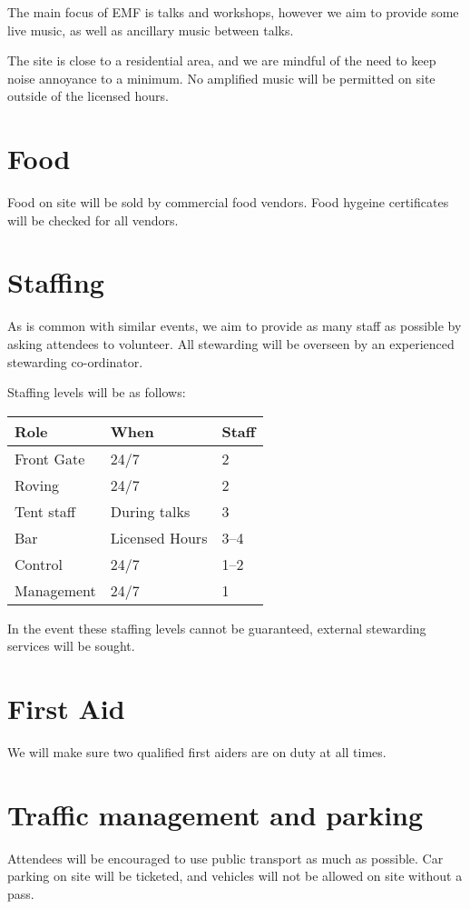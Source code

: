 The main focus of EMF is talks and workshops, however we aim to provide some live music,
as well as ancillary music between talks.

The site is close to a residential area, and we are mindful of the need to keep noise annoyance to a minimum.
No amplified music will be permitted on site outside of the licensed hours.

\section{Food}

Food on site will be sold by commercial food vendors. Food hygeine certificates will be checked for all vendors.

\section{Staffing}

As is common with similar events, we aim to provide as many staff as possible
by asking attendees to volunteer. All stewarding will be overseen by an experienced stewarding co-ordinator.

Staffing levels will be as follows:

\begin{tabular}{ l l l }
Role & When & Staff \\
\hline
Front Gate & 24/7 & 2 \\
Roving & 24/7 & 2 \\
Tent staff & During talks & 3 \\
Bar & Licensed Hours & 3--4 \\
Control & 24/7 & 1--2 \\
Management & 24/7 & 1
\end{tabular}

In the event these staffing levels cannot be guaranteed, external stewarding services will be sought.

\section{First Aid}

We will make sure two qualified first aiders are on duty at all times.

\section{Traffic management and parking}

Attendees will be encouraged to use public transport as much as possible. Car parking on site will be ticketed,
and vehicles will not be allowed on site without a pass.

